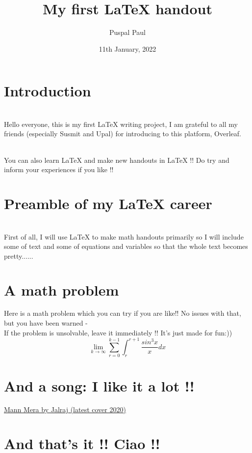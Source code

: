 \documentclass{article}
\title{My first LaTeX handout}
\author{Puspal Paul}
\date{11th January, 2022}
\begin{document}
\maketitle

\section{Introduction}
\\Hello everyone, this is my first LaTeX writing project, I am grateful to all my friends (especially Susmit and Upal) for introducing to this platform, Overleaf. 

\\You can also learn LaTeX and make new handouts in LaTeX !! Do try and inform your experiences if you like !!
\maketitle

\section{Preamble of my LaTeX career}
\\First of all, I will use LaTeX to make math handouts primarily so I will include some of  text and some of equations and variables so that the whole text becomes pretty......

\maketitle

\section{A math problem}
Here is a math problem which you can try if you are like!! No issues with that, but you have been warned - 
\\If the problem is unsolvable, leave it immediately !! It's just made for fun:))  
\begin{displaymath}
    \lim_{k\rightarrow \infty} \sum_{r=0}^{k-1} \int_{r}^{r+1} \frac{sin^{3}x}{x}dx
\end{displaymath}

\maketitle
\section{And a song: I like it a lot !!} 

\href{https://www.youtube.com/watch?v=GMGD-C6j0U8}{Mann Mera by Jalraj (latest cover 2020)}

\maketitle
\section{And that's it !! Ciao !!}
\end{document}
